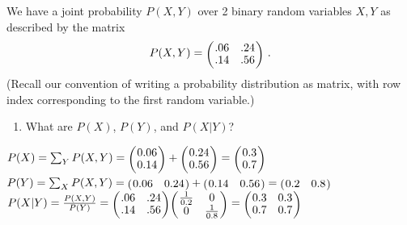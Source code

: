 

\renewcommand{\course}{Artificial Intelligence}
\renewcommand{\coursepicture}{course_ai}
\renewcommand{\coursedate}{Summer 2026}

\renewcommand{\exnum}{Exercise 00}

\exercises
\exercisestitle



We have a joint probability $P(X,Y)$ over 2 binary random variables
$X,Y$ as described by the matrix
$$
P(X,Y)
= \mat{cc}{ .06 & .24 \\ .14 & .56} ~.
$$
(Recall our convention of writing a probability distribution as matrix, with row index corresponding to the first random variable.)

\begin{enumerate}
\item What are $P(X)$, $P(Y)$, and $P(X|Y)$?
\end{enumerate}

\begin{solution}
$P(X) = \sum_Y P(X, Y) = \mat{c}{ 0.06 \\ 0.14} + \mat{c}{ 0.24 \\ 0.56} = \mat{c}{ 0.3 \\ 0.7}$ \\
$P(Y) = \sum_X P(X, Y)  = \mat{cc}{ 0.06 & 0.24} + \mat{cc}{ 0.14 & 0.56} =  \mat{cc}{ 0.2 & 0.8}$ \\
$P(X|Y) = \frac{P(X,Y)}{P(Y)} = \mat{cc}{ .06 & .24 \\ .14 & .56} \mat{cc}{ \frac{1}{0.2} & 0 \\ 0 & \frac{1}{0.8}} = \mat{cc}{ 0.3 & 0.3 \\ 0.7 & 0.7}  $

\end{solution}


